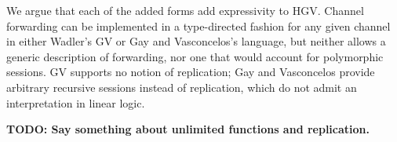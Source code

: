 \documentclass{easychair}
\newcommand{\key}{\mathsf}
\newcommand{\gvInput}[2]{\mathord{?}{#1}.{#2}}
\newcommand{\gvEndOutput}{\key{end}_!}
\newcommand{\gvEndInput}{\key{end}_?}
\newcommand{\gvj}[3]{{#1} \vdash {#2} : {#3}}
\newcommand{\gvTimes}[2]{{#1} \otimes {#2}}
\newcommand{\gvLink}[2]{\key{link}~{#1}~{#2}}
\newcommand{\gvReceive}[1]{\key{receive}~{#1}}
\newcommand{\gvTerminate}[1]{\key{terminate}~{#1}}
\newcommand{\gvSendType}[2]{\key{sendType}~{#1}~{#2}}
\newcommand{\gvReceiveType}[2]{\key{receiveType}~{#1}~{#2}}
\newcommand{\gvServe}[2]{\key{serve}~{#1}.{#2}}
\newcommand{\gvRequest}[1]{\key{request}~{#1}}
\newcommand{\hgv}{HGV\xspace}
\newcommand{\todo}[1]{\textbf{\color{red}TODO: #1}}
\begin{document}
We argue that each of the added forms add expressivity to \hgv.  Channel forwarding can be
implemented in a type-directed fashion for any given channel in either Wadler's GV or Gay and
Vasconcelos's language, but neither allows a generic description of forwarding, nor one that would
account for polymorphic sessions.  GV supports no notion of replication; Gay and Vasconcelos provide
arbitrary recursive sessions instead of replication, which do not admit an interpretation in linear
logic.

\todo{Say something about unlimited functions and replication.}

\end{document}
